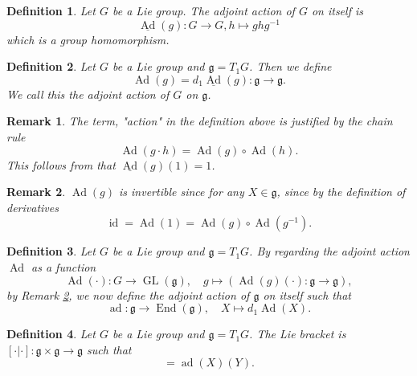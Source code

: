 \documentclass{article}
\newtheorem{definition}{Definition}[section]
\newtheorem{remark}{Remark}[section]
\numberwithin{equation}{section}
\DeclareMathOperator{\Ad}{Ad}
\DeclareMathOperator{\ad}{ad}
\DeclareMathOperator{\End}{End}
\DeclareMathOperator{\GL}{GL}
\DeclareMathOperator{\id}{id}
\begin{document}
\begin{definition}
Let $G$ be a Lie group. The adjoint action of $G$ on itself is 
\begin{equation*}
\underline{\Ad}(g):G\to G, h\mapsto ghg^{-1}
\end{equation*}
which is a group homomorphism.
\end{definition}

\begin{definition}
Let $G$ be a Lie group and $\mathfrak{g} = T_1G$. Then we define
\begin{equation*}
\Ad(g) = d_1\underline{\Ad}(g):\mathfrak{g}\to\mathfrak{g}.
\end{equation*}
We call this the adjoint action of $G$ on $\mathfrak{g}$.
\end{definition}

\begin{remark}
The term, "action" in the definition above is justified by the chain rule
\begin{equation*}
\Ad(g\cdot h) = \Ad(g)\circ\Ad(h).
\end{equation*}
This follows from that $\underline{\Ad}(g)(1) = 1$. 
\end{remark}

\begin{remark}
$\Ad(g)$ is invertible since for any $X\in\mathfrak{g}$, since by the definition of derivatives
\begin{equation*}
\id = \Ad(1) = \Ad(g)\circ\Ad(g^{-1}).
\end{equation*}
\label{invertible_ad_action}
\end{remark}

\begin{definition}
Let $G$ be a Lie group and $\mathfrak{g}=T_1G$. By regarding the adjoint action $\Ad$ as a function 
\begin{equation*}
\Ad(\cdot):G\to\GL(\mathfrak{g}),\quad g\mapsto (\Ad(g)(\cdot):\mathfrak{g}\to\mathfrak{g}),
\end{equation*}
by Remark \ref{invertible_ad_action}, we now define the adjoint action of $\mathfrak{g}$ on itself such that 
\begin{equation*}
\ad:\mathfrak{g}\to\End(\mathfrak{g}),\quad X\mapsto d_1\Ad(X).
\end{equation*}
\end{definition}

\begin{definition}
Let $G$ be a Lie group and $\mathfrak{g}=T_1G$. The Lie bracket is $[\cdot|\cdot]:\mathfrak{g}\times\mathfrak{g}\to\mathfrak{g}$ such that 
\begin{equation*}
[X|Y] = \ad(X)(Y).
\end{equation*}
\end{definition}
\end{document}
